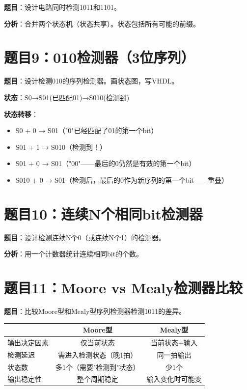 \textbf{题目}：设计电路同时检测1011和1101。

\textbf{分析}：合并两个状态机（状态共享）。状态包括所有可能的前缀。

\section*{题目9：010检测器（3位序列）}

\textbf{题目}：设计检测010的序列检测器。画状态图，写VHDL。

\textbf{状态}：S0→S01(已匹配01)→S010(检测到)

\textbf{状态转移}：
\begin{itemize}
  \item S0 + 0 → S01（"0"已经匹配了01的第一个bit）
  \item S01 + 1 → S010（检测到！）
  \item S01 + 0 → S01（"00"——最后的0仍然是有效的第一个bit）
  \item S010 + 0 → S01（检测后，最后的0作为新序列的第一个bit——重叠）
\end{itemize}

\section*{题目10：连续N个相同bit检测器}

\textbf{题目}：设计检测连续N个0（或连续N个1）的检测器。

\textbf{分析}：用一个计数器统计连续相同bit的个数。

\section*{题目11：Moore vs Mealy检测器比较}

\textbf{题目}：比较Moore型和Mealy型序列检测器检测1011的差异。

\begin{center}
\begin{tabular}{|l|c|c|}
\hline
 & \textbf{Moore型} & \textbf{Mealy型} \\
\hline
输出决定因素 & 仅当前状态 & 当前状态+输入 \\
检测延迟 & 需进入检测状态（晚1拍）& 同一拍输出 \\
状态数 & 多1个（需要"检测到"状态）& 少1个 \\
输出稳定性 & 整个周期稳定 & 输入变化时可能变 \\
\hline
\end{tabular}
\end{center}

